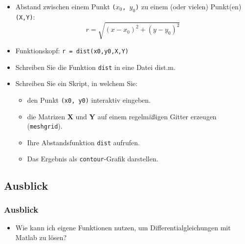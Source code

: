   \secMexercise
  \begin{frame}
      \frameMexercise
      \begin{exercise}
          \sloppy
          \begin{itemize}
            \item Abstand zwischen einem Punkt \texttt{($x_{0}$, $y_{0}$)} zu einem (oder vielen) Punkt(en) \texttt{(X,Y)}:
            \begin{displaymath}
              r = \sqrt{(x - x_{0})^{2} + (y - y_{0})^{2}}
            \end{displaymath}
            \item Funktionskopf: \texttt{r = dist(x0,y0,X,Y)}
            \item Schreiben Sie die Funktion \texttt{dist} in eine Datei dist.m.
            \item Schreiben Sie ein Skript, in welchem Sie:
            \begin{itemize}
              \item den Punkt \texttt{(x0, y0)} interaktiv eingeben.
              \item die Matrizen \textbf{X} und \textbf{Y} auf einem regelmäßigen Gitter erzeugen (\texttt{meshgrid}).
              \item Ihre Abstandsfunktion \texttt{dist} aufrufen.
              \item Das Ergebnis als \texttt{contour}-Grafik darstellen.
            \end{itemize}
          \end{itemize}
      \end{exercise}
  \end{frame}

  \subsection{Ausblick}
  \begin{frame}
      \frametitle{Ausblick}
      \begin{itemize}
        \item Wie kann ich eigene Funktionen nutzen, um Differentialgleichungen mit Matlab zu lösen?
      \end{itemize}
  \end{frame}




